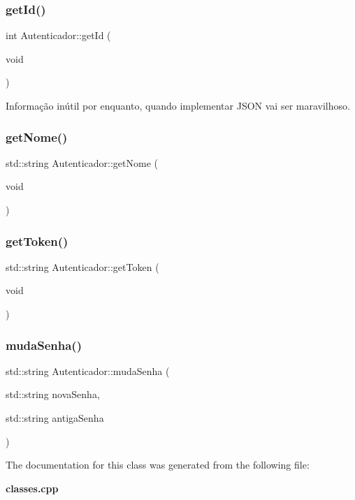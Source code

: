 \mbox{\label{class_autenticador_a5e525cb7934385d6cda445245a589d1e}} 
\subsubsection{get\+Id()}
{\footnotesize\ttfamily int Autenticador\+::get\+Id (\begin{DoxyParamCaption}\item[{void}]{ }\end{DoxyParamCaption})\hspace{0.3cm}{\ttfamily [inline]}}

Informação inútil por enquanto, quando implementar J\+S\+ON vai ser maravilhoso. \mbox{\label{class_autenticador_a6ac64162bdff37c3a84c2212f768f1a4}} 
\subsubsection{get\+Nome()}
{\footnotesize\ttfamily std\+::string Autenticador\+::get\+Nome (\begin{DoxyParamCaption}\item[{void}]{ }\end{DoxyParamCaption})\hspace{0.3cm}{\ttfamily [inline]}}

\mbox{\label{class_autenticador_a86e039f92325107cb467cf519dea102c}} 
\subsubsection{get\+Token()}
{\footnotesize\ttfamily std\+::string Autenticador\+::get\+Token (\begin{DoxyParamCaption}\item[{void}]{ }\end{DoxyParamCaption})\hspace{0.3cm}{\ttfamily [inline]}}

\mbox{\label{class_autenticador_af2c2821928097be716f7206c16a55491}} 
\subsubsection{muda\+Senha()}
{\footnotesize\ttfamily std\+::string Autenticador\+::muda\+Senha (\begin{DoxyParamCaption}\item[{std\+::string}]{nova\+Senha,  }\item[{std\+::string}]{antiga\+Senha }\end{DoxyParamCaption})\hspace{0.3cm}{\ttfamily [inline]}}



The documentation for this class was generated from the following file\+:\begin{DoxyCompactItemize}
\item 
\textbf{ classes.\+cpp}\end{DoxyCompactItemize}
